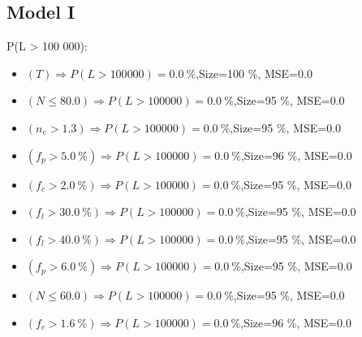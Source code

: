 \documentclass[numbered]{CSL}
\begin{document}
\subsection{Model I}
P(L > 100 000):
\begin{itemize}
\item $(T) \Rightarrow P(L > 100 000) = 0.0~\%$,\hfill Size=100 \%, MSE=0.0
\item $(N \leq 80.0) \Rightarrow P(L > 100 000) = 0.0~\%$,\hfill Size=95 \%, MSE=0.0
\item $(n_e > 1.3) \Rightarrow P(L > 100 000) = 0.0~\%$,\hfill Size=95 \%, MSE=0.0
\item $(f_p > 5.0~\%) \Rightarrow P(L > 100 000) = 0.0~\%$,\hfill Size=96 \%, MSE=0.0
\item $(f_c > 2.0~\%) \Rightarrow P(L > 100 000) = 0.0~\%$,\hfill Size=95 \%, MSE=0.0
\item $(f_l > 30.0~\%) \Rightarrow P(L > 100 000) = 0.0~\%$,\hfill Size=95 \%, MSE=0.0
\item $(f_l > 40.0~\%) \Rightarrow P(L > 100 000) = 0.0~\%$,\hfill Size=95 \%, MSE=0.0
\item $(f_p > 6.0~\%) \Rightarrow P(L > 100 000) = 0.0~\%$,\hfill Size=95 \%, MSE=0.0
\item $(N \leq 60.0) \Rightarrow P(L > 100 000) = 0.0~\%$,\hfill Size=95 \%, MSE=0.0
\item $(f_c > 1.6~\%) \Rightarrow P(L > 100 000) = 0.0~\%$,\hfill Size=96 \%, MSE=0.0
\end{itemize}
\end{document}
